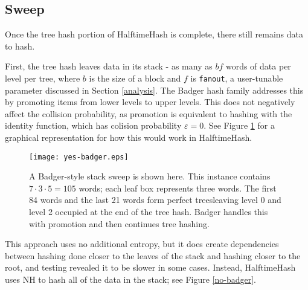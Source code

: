 \documentclass[runningheads]{llncs}
\begin{document}



\subsection{Sweep}


Once the tree hash portion of HalftimeHash is complete, there still remains data to hash.

First, the tree hash leaves data in its stack - as many as $bf$ words of data per level per tree, where $b$ is the size of a block and $f$ is \texttt{fanout}, a user-tunable parameter discussed in Section \ref{analysis}. The Badger hash family addresses this by promoting items from lower levels to upper levels.
This does not negatively affect the collision probability, as promotion is equivalent to hashing with the identity function, which has colision probability $\varepsilon = 0$.
See Figure \ref{yes-badger} for a graphical representation for how this would work in HalftimeHash.

\begin{figure}
\texttt{[image: yes-badger.eps]}
\caption{\label{yes-badger}
  A Badger-style stack sweep is shown here.
  This instance contains $7 \cdot 3 \cdot 5 = 105$ words; each leaf box represents three words.
  The first 84 words and the last 21 words form perfect treesleaving level 0 and level 2 occupied at the end of the tree hash.
  Badger handles this with promotion and then continues tree hashing. \cite{badger}
}
\end{figure}

This approach uses no additional entropy, but it does create dependencies between hashing done closer to the leaves of the stack and hashing closer to the root, and testing revealed it to be slower in some cases.
Instead, HalftimeHash uses NH to hash all of the data in the stack; see Figure \ref{no-badger}.
\end{document}
